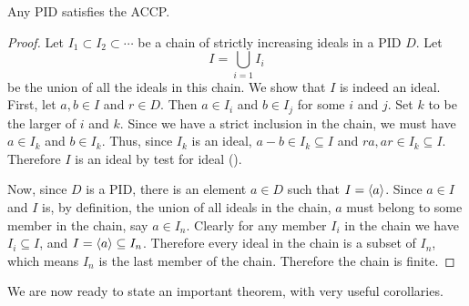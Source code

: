 \begin{lemma}\label{lemma-pid-satisfies-accp}
    Any PID satisfies the ACCP.
\end{lemma}
\begin{proof}
    Let $I_1 \subset I_2 \subset \cdots$ be a chain of strictly increasing ideals in a PID $D$. Let
    \[
        I = \bigcup_{i=1} I_i
    \]
    be the union of all the ideals in this chain. We show that $I$ is indeed an ideal. First, let $a,b\in I$ and $r \in D$. Then $a \in I_i$ and $b \in I_j$ for some $i$ and $j$. Set $k$ to be the larger of $i$ and $k$. Since we have a strict inclusion in the chain, we must have $a \in I_k$ and $b \in I_k$. Thus, since $I_k$ is an ideal, $a - b \in I_k \subseteq I$ and $ra, ar \in I_k \subseteq I$. Therefore $I$ is an ideal by test for ideal ().

    Now, since $D$ is a PID, there is an element $a \in D$ such that $I = \left\langle a\right\rangle$. Since $a \in I$ and $I$ is, by definition, the union of all ideals in the chain, $a$ must belong to some member in the chain, say $a \in I_n$. Clearly for any member $I_i$ in the chain we have $I_i \subseteq I$, and $I = \left\langle a\right\rangle \subseteq I_n$. Therefore every ideal in the chain is a subset of $I_n$, which means $I_n$ is the last member of the chain. Therefore the chain is finite.
\end{proof}

We are now ready to state an important theorem, with very useful corollaries.


